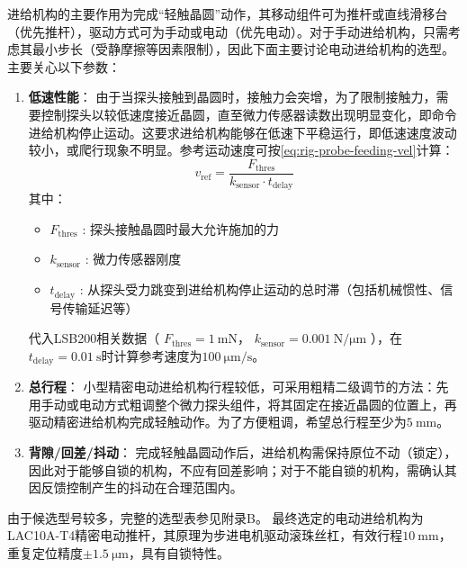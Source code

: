 进给机构的主要作用为完成“轻触晶圆”动作，其移动组件可为推杆或直线滑移台（优先推杆），驱动方式可为手动或电动（优先电动）。对于手动进给机构，只需考虑其最小步长（受静摩擦等因素限制），因此下面主要讨论电动进给机构的选型。主要关心以下参数：

\begin{enumerate}
  \item \textbf{低速性能}：
    由于当探头接触到晶圆时，接触力会突增，为了限制接触力，需要控制探头以较低速度接近晶圆，直至微力传感器读数出现明显变化，即命令进给机构停止运动。这要求进给机构能够在低速下平稳运行，即低速速度波动较小，或爬行现象不明显。参考运动速度可按\eqref{eq:rig-probe-feeding-vel}计算：
    \begin{equation}
    \label{eq:rig-probe-feeding-vel}
    v_{\mathrm{ref}} = \frac{ F_{\mathrm{thres}} }
                            { k_{\mathrm{sensor}} \cdot t_{\mathrm{delay}} }
    \end{equation}
    其中：
    \begin{itemize}
      \item $F_{\mathrm{thres}}$  : 探头接触晶圆时最大允许施加的力
      \item $k_{\mathrm{sensor}}$ : 微力传感器刚度
      \item $t_{\mathrm{delay}}$  :  从探头受力跳变到进给机构停止运动的总时滞（包括机械惯性、信号传输延迟等）
    \end{itemize}
    代入LSB200相关数据（
    $F_{\mathrm{thres}} = \SI{1}{\milli\newton}$，
    $k_{\mathrm{sensor}} = \SI[per-mode=symbol]{0.001}{\newton\per\micro\meter}$
    ），在$t_{\mathrm{delay}} = \SI{0.01}{\second}$时计算参考速度为$\SI[per-mode=symbol]{100}{\micro\meter\per\second}$。
  \item \textbf{总行程}：
    小型精密电动进给机构行程较低，可采用粗精二级调节的方法：先用手动或电动方式粗调整个微力探头组件，将其固定在接近晶圆的位置上，再驱动精密进给机构完成轻触动作。为了方便粗调，希望总行程至少为$\SI{5}{\milli\meter}$。
  \item \textbf{背隙/回差/抖动}：
    完成轻触晶圆动作后，进给机构需保持原位不动（锁定），因此对于能够自锁的机构，不应有回差影响；对于不能自锁的机构，需确认其因反馈控制产生的抖动在合理范围内。
\end{enumerate}

由于候选型号较多，完整的选型表参见附录B。 %
最终选定的电动进给机构为LAC10A-T4精密电动推杆，其原理为步进电机驱动滚珠丝杠，有效行程$\SI{10}{\milli\meter}$，重复定位精度$\pm\SI{1.5}{\micro\meter}$，具有自锁特性。



